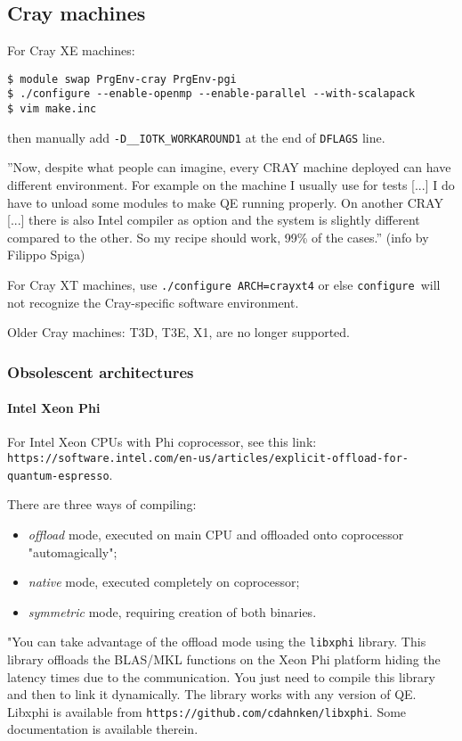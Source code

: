 \documentclass[12pt,a4paper]{article}
\def\configure{\texttt{configure}}
\begin{document}
\subsection{Cray machines}

For Cray XE machines:
\begin{verbatim}
$ module swap PrgEnv-cray PrgEnv-pgi
$ ./configure --enable-openmp --enable-parallel --with-scalapack
$ vim make.inc
\end{verbatim}
then manually add \texttt{-D\_\_IOTK\_WORKAROUND1} at the end of \texttt{DFLAGS} line.

''Now, despite what people can imagine, every CRAY machine deployed can
have different environment. For example on the machine I usually use
for tests [...] I do have to unload some modules to make QE running
properly. On another CRAY [...] there is also Intel compiler as option
and the system is slightly different compared to the other.
So my recipe should work, 99\% of the cases.'' (info by Filippo Spiga)

For Cray XT machines, use \texttt{./configure ARCH=crayxt4} or else
\configure\ will not recognize the Cray-specific software environment.

Older Cray machines: T3D, T3E, X1, are no longer supported.

\subsubsection{Obsolescent architectures}

\paragraph{Intel Xeon Phi}

For Intel Xeon CPUs with Phi coprocessor, see this link:\\
\texttt{https://software.intel.com/en-us/articles/explicit-offload-for-quantum-espresso}.

There are three ways of compiling:
\begin{itemize}
\item {\em offload} mode, executed on main CPU and offloaded onto coprocessor
"automagically";
\item {\em native} mode, executed completely on coprocessor;
\item {\em symmetric} mode, requiring creation of both binaries.
\end{itemize}
"You can take advantage of the offload mode using the \texttt{libxphi}
library. This library offloads the BLAS/MKL functions on the Xeon Phi
platform hiding the latency times due to the communication. You just
need to compile this library and then to link it dynamically. The
library works with any version of QE. Libxphi is available from
\texttt{https://github.com/cdahnken/libxphi}. Some documentation is
available therein.
\end{document}
